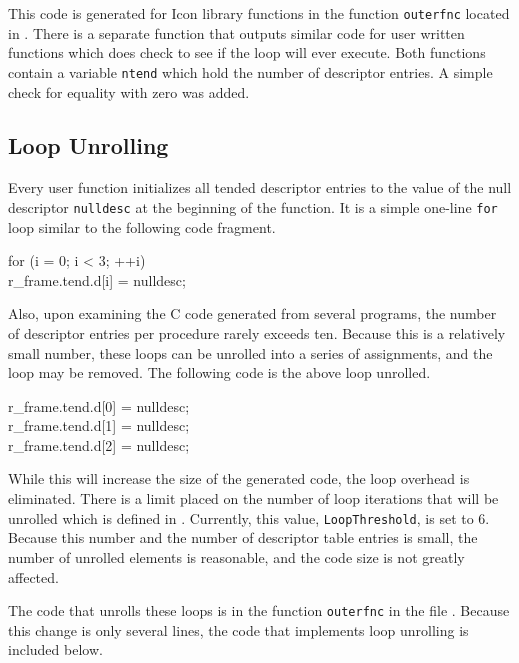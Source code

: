 This code is generated for Icon library functions in the function
\texttt{outerfnc} located in . There is a separate
function that outputs similar code for user written functions which
does check to see if the loop will ever execute. Both functions
contain a variable \texttt{ntend} which hold the number of descriptor
entries. A simple check for equality with zero was added.

\subsection{Loop Unrolling}

Every user function initializes all tended descriptor entries to the
value of the null descriptor \texttt{nulldesc} at the beginning of the
function. It is a simple one-line \texttt{for} loop similar to the
following code fragment.

\goodbreak
\begin{iconcode}
for (i = 0; i < 3; ++i)\\
\>r\_frame.tend.d[i] = nulldesc;\\
\end{iconcode}


Also, upon examining the C code generated from several programs, the
number of descriptor entries per procedure rarely exceeds ten. Because
this is a relatively small number, these loops can be unrolled into a
series of assignments, and the loop may be removed. The following code
is the above loop unrolled.

\goodbreak
\begin{iconcode}
r\_frame.tend.d[0] = nulldesc;\\
r\_frame.tend.d[1] = nulldesc;\\
r\_frame.tend.d[2] = nulldesc;\\
\end{iconcode}

While this will increase the size of the generated code, the loop
overhead is eliminated. There is a limit placed on the number of loop
iterations that will be unrolled which is defined in
. Currently, this value, \texttt{LoopThreshold}, is
set to 6. Because this number and the number of descriptor table
entries is small, the number of unrolled elements is reasonable, and
the code size is not greatly affected.


The code that unrolls these loops is in the function \texttt{outerfnc}
in the file . Because this change is only several
lines, the code that implements loop unrolling is included below.

